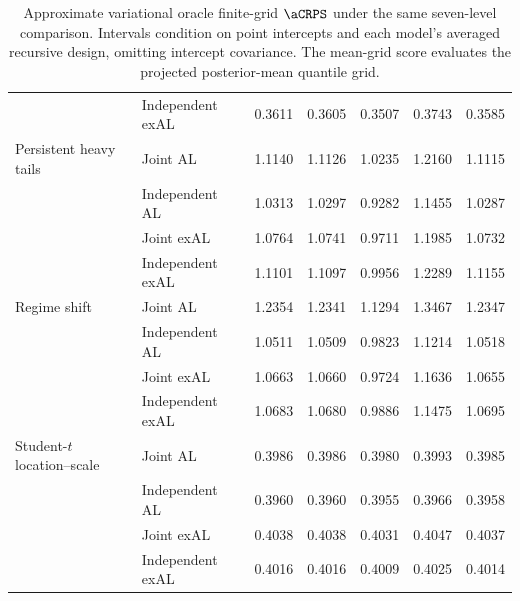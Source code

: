 \begin{table}[p]
\begin{tabular}{@{}>{\raggedright\arraybackslash}p{}>{\raggedright\arraybackslash}p{}rrrrr@{}}
 & Independent exAL & 0.3611 & 0.3605 & 0.3507 & 0.3743 & 0.3585 \\
\addlinespace[2pt]
Persistent heavy tails & Joint AL & 1.1140 & 1.1126 & 1.0235 & 1.2160 & 1.1115 \\
 & Independent AL & 1.0313 & 1.0297 & 0.9282 & 1.1455 & 1.0287 \\
 & Joint exAL & 1.0764 & 1.0741 & 0.9711 & 1.1985 & 1.0732 \\
 & Independent exAL & 1.1101 & 1.1097 & 0.9956 & 1.2289 & 1.1155 \\
\addlinespace[2pt]
Regime shift & Joint AL & 1.2354 & 1.2341 & 1.1294 & 1.3467 & 1.2347 \\
 & Independent AL & 1.0511 & 1.0509 & 0.9823 & 1.1214 & 1.0518 \\
 & Joint exAL & 1.0663 & 1.0660 & 0.9724 & 1.1636 & 1.0655 \\
 & Independent exAL & 1.0683 & 1.0680 & 0.9886 & 1.1475 & 1.0695 \\
\addlinespace[2pt]
Student-\(t\) location--scale & Joint AL & 0.3986 & 0.3986 & 0.3980 & 0.3993 & 0.3985 \\
 & Independent AL & 0.3960 & 0.3960 & 0.3955 & 0.3966 & 0.3958 \\
 & Joint exAL & 0.4038 & 0.4038 & 0.4031 & 0.4047 & 0.4037 \\
 & Independent exAL & 0.4016 & 0.4016 & 0.4009 & 0.4025 & 0.4014 \\
\bottomrule
\end{tabular}
\caption{Approximate variational oracle finite-grid \(\aCRPS\) under the same seven-level comparison. Intervals condition on point intercepts and each model's averaged recursive design, omitting intercept covariance. The mean-grid score evaluates the projected posterior-mean quantile grid.}
\label{tab:joint-qdesn-pure-desn-v2-vb-score}
\end{table}
